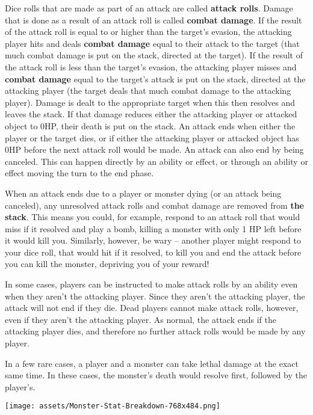 \documentclass[10pt, a4paper, twoside]{article} %
\begin{document}
    Dice rolls that are made as part of an attack are called \textbf{attack rolls}. Damage that is done as a result of an attack roll is called \textbf{combat damage}. If the result of the attack roll is equal to or higher than the target’s evasion, the attacking player hits and deals \textbf{combat damage} equal to their attack to the target (that much combat damage is put on the stack, directed at the target). If the result of the attack roll is less than the target’s evasion, the attacking player misses and \textbf{combat damage} equal to the target’s attack is put on the stack, directed at the attacking player (the target deals that much combat damage to the attacking player). Damage is dealt to the appropriate target when this then resolves and leaves the stack. If that damage reduces either the attacking player or attacked object to 0HP, their death is put on the stack. An attack ends when either the player or the target dies, or if either the attacking player or attacked object has 0HP before the next attack roll would be made. An attack can also end by being canceled. This can happen directly by an ability or effect, or through an ability or effect moving the turn to the end phase.

    When an attack ends due to a player or monster dying (or an attack being canceled), any unresolved attack rolls and combat damage are removed from \textbf{the stack}. This means you could, for example, respond to an attack roll that would miss if it resolved and play a bomb, killing a monster with only 1 HP left before it would kill you. Similarly, however, be wary – another player might respond to your dice roll, that would hit if it resolved, to kill you and end the attack before you can kill the monster, depriving you of your reward!

    In some cases, players can be instructed to make attack rolls by an ability even when they aren’t the attacking player. Since they aren’t the attacking player, the attack will not end if they die. Dead players cannot make attack rolls, however, even if they aren’t the attacking player. As normal, the attack ends if the attacking player dies, and therefore no further attack rolls would be made by any player.

    In a few rare cases, a player and a monster can take lethal damage at the exact same time. In these cases, the monster’s death would resolve first, followed by the player’s.

    \texttt{[image: assets/Monster-Stat-Breakdown-768x484.png]}
\end{document}
